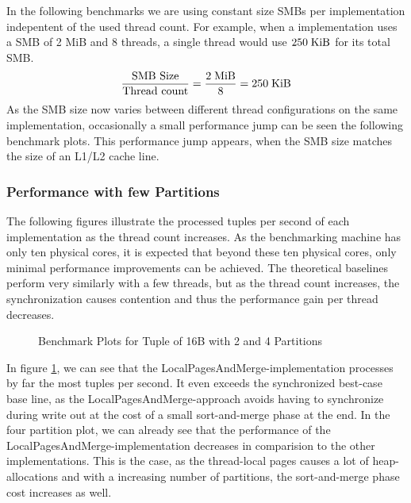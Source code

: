 In the following benchmarks we are using constant size \acp{SMB} per implementation indepentent of the used thread count.
For example, when a implementation uses a \ac{SMB} of 2 MiB and 8 threads, a single thread would use $250 \textrm{\;KiB}$ for its total \ac{SMB}.
\begin{equation}
  \frac{\textrm{SMB Size}} {\textrm{Thread count}} = \frac{2 \textrm{\;MiB}}{8} = 250 \textrm{\;KiB}
\end{equation}
As the \ac{SMB} size now varies between different thread configurations on the same implementation, occasionally a small performance jump can be seen the following benchmark plots.
This performance jump appears, when the \ac{SMB} size matches the size of an L1/L2 cache line.

\subsubsection{Performance with few Partitions}
The following figures illustrate the processed tuples per second of each implementation as the thread count increases.
As the benchmarking machine has only ten physical cores, it is expected that beyond these ten physical cores, only minimal performance improvements can be achieved.
The theoretical baselines perform very similarly with a few threads, but as the thread count increases, the synchronization causes contention and thus the performance gain per thread decreases.

\begin{figure}[h]
  \centering
  \begin{subfigure}{.49\textwidth}
    \centering
    \resizebox{\linewidth}{!}{}
  \end{subfigure}
  \begin{subfigure}{.49\textwidth}
    \centering
    \resizebox{\linewidth}{!}{}
  \end{subfigure}
  \caption[Shuffle Benchmark Plots for Tuple of 16B with 2 and 4 Partitions]{Benchmark Plots for Tuple of 16B with 2 and 4 Partitions}
  \label{plot-shuffle-16B-2-4}
\end{figure}
In figure \ref{plot-shuffle-16B-2-4}, we can see that the LocalPagesAndMerge-implementation processes by far the most tuples per second.
It even exceeds the synchronized best-case base line, as the LocalPagesAndMerge-approach avoids having to synchronize during write out at the cost of a small sort-and-merge phase at the end.
In the four partition plot, we can already see that the performance of the LocalPagesAndMerge-implementation decreases in comparision to the other implementations.
This is the case, as the thread-local pages causes a lot of heap-allocations and with a increasing number of partitions, the sort-and-merge phase cost increases as well.

